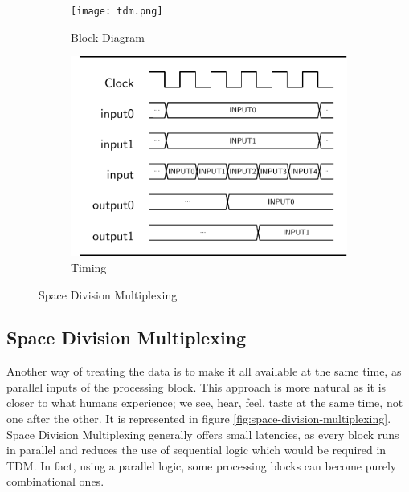 \begin{figure}
    \begin{subfigure}[c]{.5\textwidth}
        \centering
        \texttt{[image: tdm.png]}
        \caption{Block Diagram}
    \end{subfigure}
    \begin{subfigure}[c]{.5\textwidth}
        \centering
        \includegraphics[width=1\linewidth]{../timings/tdm.pdf}
        \caption{Timing}
    \end{subfigure}
    \caption{Space Division Multiplexing}
    \label{fig:time-division-multiplexing}
\end{figure}

\subsection{Space Division Multiplexing}
Another way of treating the data is to make it all available at the same time, as parallel inputs of the processing block. This approach is more natural as it is closer to what humans experience; we see, hear, feel, taste at the same time, not one after the other. It is represented in figure \ref{fig:space-division-multiplexing}. Space Division Multiplexing generally offers small latencies, as every block runs in parallel and reduces the use of sequential logic which would be required in TDM. In fact, using a parallel logic, some processing blocks can become purely combinational ones.

